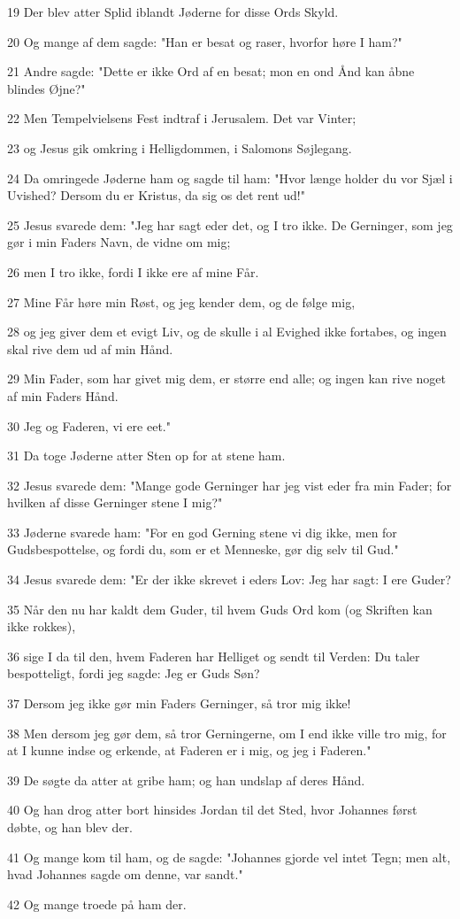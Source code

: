\par 19 Der blev atter Splid iblandt Jøderne for disse Ords Skyld.
\par 20 Og mange af dem sagde: "Han er besat og raser, hvorfor høre I ham?"
\par 21 Andre sagde: "Dette er ikke Ord af en besat; mon en ond Ånd kan åbne blindes Øjne?"
\par 22 Men Tempelvielsens Fest indtraf i Jerusalem. Det var Vinter;
\par 23 og Jesus gik omkring i Helligdommen, i Salomons Søjlegang.
\par 24 Da omringede Jøderne ham og sagde til ham: "Hvor længe holder du vor Sjæl i Uvished? Dersom du er Kristus, da sig os det rent ud!"
\par 25 Jesus svarede dem: "Jeg har sagt eder det, og I tro ikke. De Gerninger, som jeg gør i min Faders Navn, de vidne om mig;
\par 26 men I tro ikke, fordi I ikke ere af mine Får.
\par 27 Mine Får høre min Røst, og jeg kender dem, og de følge mig,
\par 28 og jeg giver dem et evigt Liv, og de skulle i al Evighed ikke fortabes, og ingen skal rive dem ud af min Hånd.
\par 29 Min Fader, som har givet mig dem, er større end alle; og ingen kan rive noget af min Faders Hånd.
\par 30 Jeg og Faderen, vi ere eet."
\par 31 Da toge Jøderne atter Sten op for at stene ham.
\par 32 Jesus svarede dem: "Mange gode Gerninger har jeg vist eder fra min Fader; for hvilken af disse Gerninger stene I mig?"
\par 33 Jøderne svarede ham: "For en god Gerning stene vi dig ikke, men for Gudsbespottelse, og fordi du, som er et Menneske, gør dig selv til Gud."
\par 34 Jesus svarede dem: "Er der ikke skrevet i eders Lov: Jeg har sagt: I ere Guder?
\par 35 Når den nu har kaldt dem Guder, til hvem Guds Ord kom (og Skriften kan ikke rokkes),
\par 36 sige I da til den, hvem Faderen har Helliget og sendt til Verden: Du taler bespotteligt, fordi jeg sagde: Jeg er Guds Søn?
\par 37 Dersom jeg ikke gør min Faders Gerninger, så tror mig ikke!
\par 38 Men dersom jeg gør dem, så tror Gerningerne, om I end ikke ville tro mig, for at I kunne indse og erkende, at Faderen er i mig, og jeg i Faderen."
\par 39 De søgte da atter at gribe ham; og han undslap af deres Hånd.
\par 40 Og han drog atter bort hinsides Jordan til det Sted, hvor Johannes først døbte, og han blev der.
\par 41 Og mange kom til ham, og de sagde: "Johannes gjorde vel intet Tegn; men alt, hvad Johannes sagde om denne, var sandt."
\par 42 Og mange troede på ham der.

